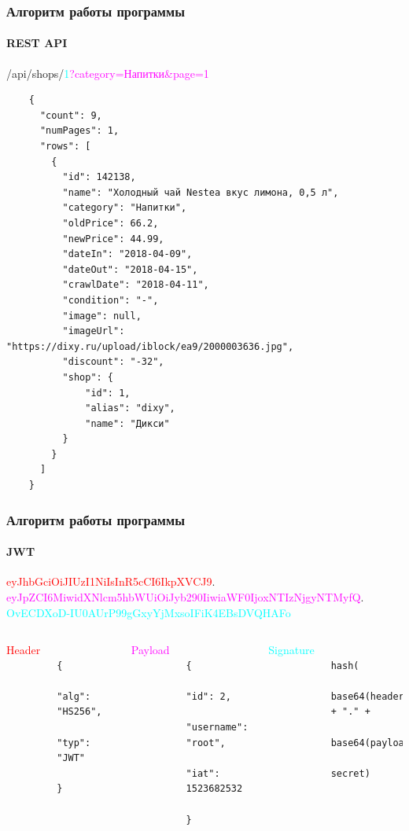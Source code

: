 \documentclass{beamer}
\begin{document}
\begin{frame}[fragile]
    \frametitle{Алгоритм работы программы}
    \framesubtitle{REST API}

    /api/shops/\textcolor{cyan}{1}\textcolor{magenta}{?category=Напитки\&page=1}
    \medskip
    \begin{verbatim}
    {
      "count": 9,
      "numPages": 1,
      "rows": [
        {
          "id": 142138,
          "name": "Холодный чай Nestea вкус лимона, 0,5 л",
          "category": "Напитки",
          "oldPrice": 66.2,
          "newPrice": 44.99,
          "dateIn": "2018-04-09",
          "dateOut": "2018-04-15",
          "crawlDate": "2018-04-11",
          "condition": "-",
          "image": null,
          "imageUrl": "https://dixy.ru/upload/iblock/ea9/2000003636.jpg",
          "discount": "-32",
          "shop": {
              "id": 1,
              "alias": "dixy",
              "name": "Дикси"
          }
        }
      ]
    }
    \end{verbatim}
\end{frame}

\begin{frame}[fragile]
    \frametitle{Алгоритм работы программы}
    \framesubtitle{JWT}
    \begin{center}
      \textcolor{red}{eyJhbGciOiJIUzI1NiIsInR5cCI6IkpXVCJ9}.
      \textcolor{magenta}{eyJpZCI6MiwidXNlcm5hbWUiOiJyb290IiwiaWF0IjoxNTIzNjgyNTMyfQ}.
      \textcolor{cyan}{OvECDXoD-IU0AUrP99gGxyYjMxsoIFiK4EBsDVQHAFo}
    \end{center}
    \medskip
    \begin{columns}[t]
        \textcolor{red}{Header}
        \medskip
        \begin{verbatim}
            {
              "alg": "HS256",
              "typ": "JWT"
            }
        \end{verbatim}
        \textcolor{magenta}{Payload}
        \medskip
        \begin{verbatim}
            {
              "id": 2,
              "username": "root",
              "iat": 1523682532
            }
        \end{verbatim}
        \textcolor{cyan}{Signature}
        \medskip
        \begin{verbatim}
            hash(
              base64(header) + "." +
              base64(payload),
              secret)
        \end{verbatim}
    \end{columns}
\end{frame}
\end{document}

